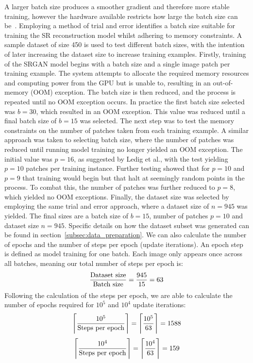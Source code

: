 A larger batch size produces a smoother gradient and therefore more stable training, however the hardware available restricts how large the batch size can be~\cite{batchSizeTest}. Employing a method of trial and error identifies a batch size suitable for training the SR reconstruction model whilst adhering to memory constraints. A sample dataset of size 450 is used to test different batch sizes, with the intention of later increasing the dataset size to increase training examples. Firstly, training of the SRGAN model begins with a batch size and a single image patch per training example. The system attempts to allocate the required memory resources and computing power from the GPU but is unable to, resulting in an out-of-memory (OOM) exception. The batch size is then reduced, and the process is repeated until no OOM exception occurs. In practice the first batch size selected was $b = 30$, which resulted in an OOM exception. This value was reduced until a final batch size of $b = 15$ was selected. The next step was to test the memory constraints on the number of patches taken from each training example. A similar approach was taken to selecting batch size, where the number of patches was reduced until running model training no longer yielded an OOM exception. The initial value was $p = 16$, as suggested by Ledig et al., with the test yielding $p = 10$ patches per training instance. Further testing showed that for $p = 10$ and $p = 9$ that training would begin but that halt at seemingly random points in the process. To combat this, the number of patches was further reduced to $p = 8$, which yielded no OOM exceptions. Finally, the dataset size was selected by employing the same trial and error approach, where a dataset size of $n = 945$ was yielded. The final sizes are a batch size of $b = 15$, number of patches $p = 10$ and dataset size $n = 945$. Specific details on how the dataset subset was generated can be found in section~\ref{subsec:data_preparation}. We can also calculate the number of epochs and the number of steps per epoch (update iterations). An epoch step is defined as model training for one batch. Each image only appears once across all batches, meaning our total number of steps per epoch is:
\[\frac{\textnormal{Dataset size}}{\textnormal{Batch size}} = \frac{945}{15} = 63\]
Following the calculation of the steps per epoch, we are able to calculate the number of epochs required for $10^5$ and $10^4$ update iterations:
\[\Bigg\lceil\frac{10^5}{\textnormal{Steps per epoch}}\Bigg\rceil = \Bigg\lceil\frac{10^5}{63}\Bigg\rceil = 1588\]
\[\Bigg\lceil\frac{10^4}{\textnormal{Steps per epoch}}\Bigg\rceil = \Bigg\lceil\frac{10^4}{63}\Bigg\rceil = 159\]
